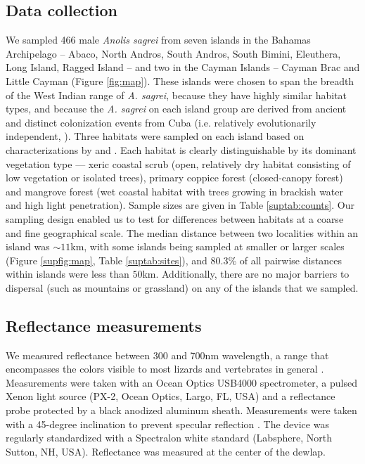 
\subsection*{Data collection}
	
We sampled 466 male \textit{Anolis sagrei} from seven islands in the Bahamas Archipelago -- Abaco, North Andros, South Andros, South Bimini, Eleuthera, Long Island, Ragged Island -- and two in the Cayman Islands -- Cayman Brac and Little Cayman (Figure \ref{fig:map}). These islands were chosen to span the breadth of the West Indian range of \textit{A. sagrei}, because they have highly similar habitat types,  and because the \textit{A. sagrei} on each island group are derived from ancient and distinct colonization events from Cuba (i.e. relatively evolutionarily independent, \citealt{Reynolds2020}). Three habitats were sampled on each island based on characterizations by \citet{Howard1950} and \citet{Schoener1968}. Each habitat is clearly distinguishable by its dominant vegetation type --- xeric coastal scrub (open, relatively dry habitat consisting of low vegetation or isolated trees), primary coppice forest (closed-canopy forest) and mangrove forest (wet coastal habitat with trees growing in brackish water and high light penetration). Sample sizes are given in Table \ref{suptab:counts}. Our sampling design enabled us to test for differences between habitats at a coarse and fine geographical scale. The median distance between two localities within an island was $\sim 11$km, with some islands being sampled at smaller or larger scales (Figure \ref{supfig:map}, Table \ref{suptab:sites}), and $80.3$\% of all pairwise distances within islands were less than $50$km. Additionally, there are no major barriers to dispersal (such as mountains or grassland) on any of the islands that we sampled.
	
\subsection*{Reflectance measurements}

We measured reflectance between 300 and 700nm wavelength, a range that encompasses the colors visible to most lizards and vertebrates in general \citep{Lazareva2012}. Measurements were taken with an Ocean Optics USB4000 spectrometer, a pulsed Xenon light source (PX-2, Ocean Optics, Largo, FL, USA) and a reflectance probe protected by a black anodized aluminum sheath. Measurements were taken with a 45-degree inclination to prevent specular reflection \citep{Endler1990}. The device was regularly standardized with a Spectralon white standard (Labsphere, North Sutton, NH, USA). Reflectance was measured at the center of the dewlap.

